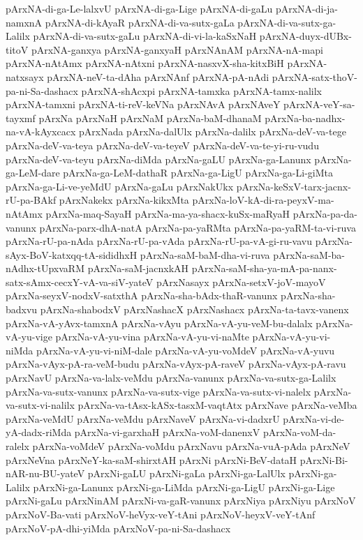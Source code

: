 {pArxNA-di-ga-Le-lalxvU
pArxNA-di-ga-Lige
pArxNA-di-gaLu
pArxNA-di-ja-namxnA
pArxNA-di-kAyaR
pArxNA-di-va-sutx-gaLa
pArxNA-di-va-sutx-ga-Lalilx
pArxNA-di-va-sutx-gaLu
pArxNA-di-vi-la-kaSxNaH
pArxNA-duyx-dUBx-titoV
pArxNA-ganxya
pArxNA-ganxyaH
pArxNAnAM
pArxNA-nA-mapi
pArxNA-nAtAmx
pArxNA-nAtxni
pArxNA-nasxvX-sha-kitxBiH
pArxNA-natxsayx
pArxNA-neV-ta-dAha
pArxNAnf
pArxNA-pA-nAdi
pArxNA-satx-thoV-pa-ni-Sa-dashacx
pArxNA-shAcxpi
pArxNA-tamxka
pArxNA-tamx-nalilx
pArxNA-tamxni
pArxNA-ti-reV-keVNa
pArxNAvA
pArxNAveY
pArxNA-veY-sa-tayxmf
pArxNa
pArxNaH
pArxNaM
pArxNa-baM-dhanaM
pArxNa-ba-nadhx-na-vA-kAyxcacx
pArxNada
pArxNa-dalUlx
pArxNa-dalilx
pArxNa-deV-va-tege
pArxNa-deV-va-teya
pArxNa-deV-va-teyeV
pArxNa-deV-va-te-yi-ru-vudu
pArxNa-deV-va-teyu
pArxNa-diMda
pArxNa-gaLU
pArxNa-ga-Lanunx
pArxNa-ga-LeM-dare
pArxNa-ga-LeM-dathaR
pArxNa-ga-LigU
pArxNa-ga-Li-giMta
pArxNa-ga-Li-ve-yeMdU
pArxNa-gaLu
pArxNakUkx
pArxNa-keSxV-tarx-jacnx-rU-pa-BAkf
pArxNakekx
pArxNa-kikxMta
pArxNa-loV-kA-di-ra-peyxV-ma-nAtAmx
pArxNa-maq-SayaH
pArxNa-ma-ya-shacx-kuSx-maRyaH
pArxNa-pa-da-vanunx
pArxNa-parx-dhA-natA
pArxNa-pa-yaRMta
pArxNa-pa-yaRM-ta-vi-ruva
pArxNa-rU-pa-nAda
pArxNa-rU-pa-vAda
pArxNa-rU-pa-vA-gi-ru-vavu
pArxNa-sAyx-BoV-katxqq-tA-sididhxH
pArxNa-saM-baM-dha-vi-ruva
pArxNa-saM-ba-nAdhx-tUpxvaRM
pArxNa-saM-jacnxkAH
pArxNa-saM-sha-ya-mA-pa-nanx-satx-sAmx-cecxY-vA-va-siV-yateV
pArxNasayx
pArxNa-setxV-joV-mayoV
pArxNa-seyxV-nodxV-satxthA
pArxNa-sha-bAdx-thaR-vanunx
pArxNa-sha-badxvu
pArxNa-shabodxV
pArxNashacX
pArxNashacx
pArxNa-ta-tavx-vanenx
pArxNa-vA-yAvx-tamxnA
pArxNa-vAyu
pArxNa-vA-yu-veM-bu-dalalx
pArxNa-vA-yu-vige
pArxNa-vA-yu-vina
pArxNa-vA-yu-vi-naMte
pArxNa-vA-yu-vi-niMda
pArxNa-vA-yu-vi-niM-dale
pArxNa-vA-yu-voMdeV
pArxNa-vA-yuvu
pArxNa-vAyx-pA-ra-veM-budu
pArxNa-vAyx-pA-raveV
pArxNa-vAyx-pA-ravu
pArxNavU
pArxNa-va-lalx-veMdu
pArxNa-vanunx
pArxNa-va-sutx-ga-Lalilx
pArxNa-va-sutx-vanunx
pArxNa-va-sutx-vige
pArxNa-va-sutx-vi-nalelx
pArxNa-va-sutx-vi-nalilx
pArxNa-va-tAsx-kASx-tasxM-vaqtAtx
pArxNave
pArxNa-veMba
pArxNa-veMdU
pArxNa-veMdu
pArxNaveV
pArxNa-vi-dadxrU
pArxNa-vi-de-yA-dadx-riMda
pArxNa-vi-garxhaH
pArxNa-voM-danenxV
pArxNa-voM-da-ralelx
pArxNa-voMdeV
pArxNa-voMdu
pArxNavu
pArxNa-vuA-pAda
pArxNeV
pArxNeVna
pArxNeY-ka-saM-shirxtAH
pArxNi
pArxNi-BeV-dataH
pArxNi-Bi-nAR-nu-BU-yateV
pArxNi-gaLU
pArxNi-gaLa
pArxNi-ga-LalUlx
pArxNi-ga-Lalilx
pArxNi-ga-Lanunx
pArxNi-ga-LiMda
pArxNi-ga-LigU
pArxNi-ga-Lige
pArxNi-gaLu
pArxNinAM
pArxNi-va-gaR-vanunx
pArxNiya
pArxNiyu
pArxNoV
pArxNoV-Ba-vati
pArxNoV-heVyx-veY-tAni
pArxNoV-heyxV-veY-tAnf
pArxNoV-pA-dhi-yiMda
pArxNoV-pa-ni-Sa-dashacx
}
